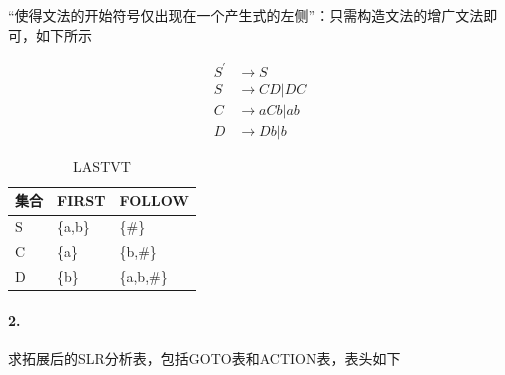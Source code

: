 \documentclass[UTF8]{ctexart} %
\begin{document}
“使得文法的开始符号仅出现在一个产生式的左侧”：只需构造文法的增广文法即可，如下所示

\begin{equation}
    \begin{aligned}
        S^{'} & \rightarrow S      \\
        S     & \rightarrow CD|DC  \\
        C     & \rightarrow aCb|ab \\
        D     & \rightarrow Db|b
    \end{aligned}
\end{equation}

\begin{table}[H]
    \centering
    \begin{tabular}{|p{2cm}<{\centering}|p{3cm}<{\centering}|p{3cm}<{\centering}|}
        \hline
        集合 & FIRST   & FOLLOW     \\
        \hline
        S  & \{a,b\} & \{\#\}     \\
        \hline
        C  & \{a\}   & \{b,\#\}   \\
        \hline
        D  & \{b\}   & \{a,b,\#\} \\
        \hline
    \end{tabular}
    \caption{LASTVT}
\end{table}

\paragraph{2.} 求拓展后的SLR分析表，包括GOTO表和ACTION表，表头如下
\end{document}

